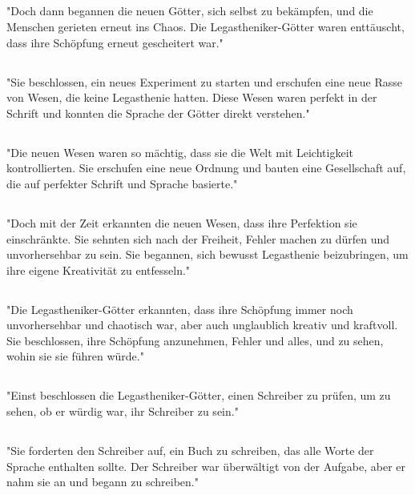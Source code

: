 \documentclass{article}
\begin{document}
\subsection{}
"Doch dann begannen die neuen Götter, sich selbst zu bekämpfen, und die Menschen gerieten erneut ins Chaos. Die Legastheniker-Götter waren enttäuscht, dass ihre Schöpfung erneut gescheitert war."
\subsection{}
"Sie beschlossen, ein neues Experiment zu starten und erschufen eine neue Rasse von Wesen, die keine Legasthenie hatten. Diese Wesen waren perfekt in der Schrift und konnten die Sprache der Götter direkt verstehen."
\subsection{}
"Die neuen Wesen waren so mächtig, dass sie die Welt mit Leichtigkeit kontrollierten. Sie erschufen eine neue Ordnung und bauten eine Gesellschaft auf, die auf perfekter Schrift und Sprache basierte."
\subsection{}
"Doch mit der Zeit erkannten die neuen Wesen, dass ihre Perfektion sie einschränkte. Sie sehnten sich nach der Freiheit, Fehler machen zu dürfen und unvorhersehbar zu sein. Sie begannen, sich bewusst Legasthenie beizubringen, um ihre eigene Kreativität zu entfesseln."
\subsection{}
"Die Legastheniker-Götter erkannten, dass ihre Schöpfung immer noch unvorhersehbar und chaotisch war, aber auch unglaublich kreativ und kraftvoll. Sie beschlossen, ihre Schöpfung anzunehmen, Fehler und alles, und zu sehen, wohin sie sie führen würde."
\subsection{}
"Einst beschlossen die Legastheniker-Götter, einen Schreiber zu prüfen, um zu sehen, ob er würdig war, ihr Schreiber zu sein."
\subsection{}
"Sie forderten den Schreiber auf, ein Buch zu schreiben, das alle Worte der Sprache enthalten sollte. Der Schreiber war überwältigt von der Aufgabe, aber er nahm sie an und begann zu schreiben."
\end{document}
